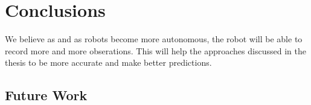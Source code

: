 \chapter{Conclusions}
\label{cha:}


We believe as and as robots become more autonomous, the robot will be able to record more and more obserations. This will help the approaches discussed in the thesis to be more accurate and make better predictions.
\section{Future Work}


